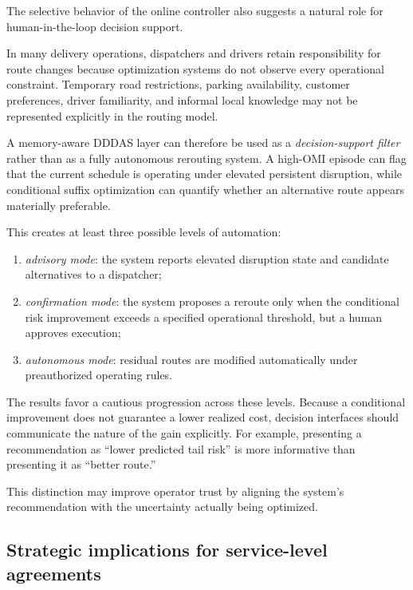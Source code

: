 \documentclass[preprint,12pt]{elsarticle}
\newcommand{\1}{\mathbf{1}}
\begin{document}
The selective behavior of the online controller also suggests a natural role
for human-in-the-loop decision support.

In many delivery operations, dispatchers and drivers retain responsibility for
route changes because optimization systems do not observe every operational
constraint. Temporary road restrictions, parking availability, customer
preferences, driver familiarity, and informal local knowledge may not be
represented explicitly in the routing model.

A memory-aware DDDAS layer can therefore be used as a \emph{decision-support
	filter} rather than as a fully autonomous rerouting system. A high-OMI episode
can flag that the current schedule is operating under elevated persistent
disruption, while conditional suffix optimization can quantify whether an
alternative route appears materially preferable.

This creates at least three possible levels of automation:
\begin{enumerate}
	\item \emph{advisory mode}: the system reports elevated disruption state and
	candidate alternatives to a dispatcher;
	
	\item \emph{confirmation mode}: the system proposes a reroute only when the
	conditional risk improvement exceeds a specified operational threshold, but
	a human approves execution;
	
	\item \emph{autonomous mode}: residual routes are modified automatically
	under preauthorized operating rules.
\end{enumerate}

The results favor a cautious progression across these levels.
Because a conditional improvement does not guarantee a lower realized cost,
decision interfaces should communicate the nature of the gain explicitly.
For example, presenting a recommendation as ``lower predicted tail risk'' is
more informative than presenting it as ``better route.''

This distinction may improve operator trust by aligning the system's
recommendation with the uncertainty actually being optimized.

\subsection{Strategic implications for service-level agreements}
\label{subsec:sla}
\end{document}
